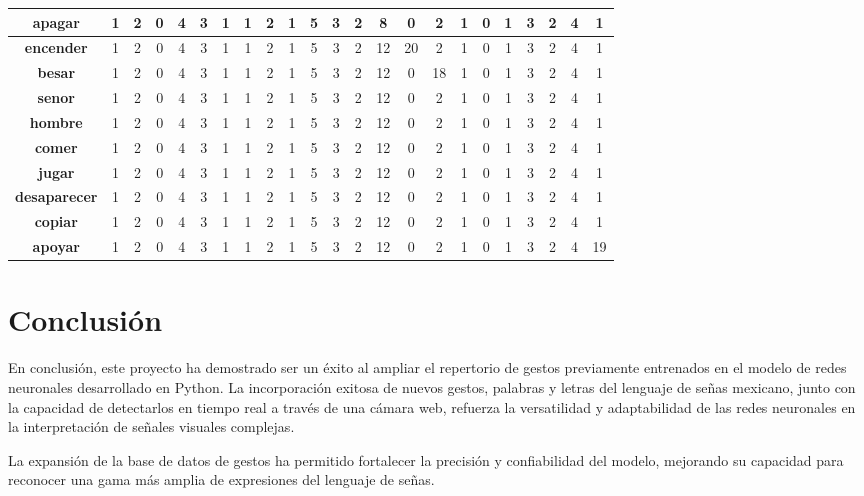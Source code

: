 \documentclass[conference]{IEEEtran}
\begin{document}
\begin{table}[h!]
{\begin{adjustbox}{angle=0}
\begin{tabular}{|c|c|c|c|c|c|c|c|c|c|c|c|c|c|c|c|c|c|c|c|c|c|c|}
\hline
\textbf{apagar} & 1 & 2 & 0 & 4 & 3 & 1 & 1 & 2 & 1 & 5 & 3 & 2 & 8 & 0 & 2 & 1 & 0 & 1 & 3 & 2 & 4 & 1 \\
\hline
\textbf{encender} & 1 & 2 & 0 & 4 & 3 & 1 & 1 & 2 & 1 & 5 & 3 & 2 & 12 & 20 & 2 & 1 & 0 & 1 & 3 & 2 & 4 & 1 \\
\hline
\textbf{besar} & 1 & 2 & 0 & 4 & 3 & 1 & 1 & 2 & 1 & 5 & 3 & 2 & 12 & 0 & 18 & 1 & 0 & 1 & 3 & 2 & 4 & 1 \\
\hline
\textbf{senor} & 1 & 2 & 0 & 4 & 3 & 1 & 1 & 2 & 1 & 5 & 3 & 2 & 12 & 0 & 2 & 1 & 0 & 1 & 3 & 2 & 4 & 1 \\
\hline
\textbf{hombre} & 1 & 2 & 0 & 4 & 3 & 1 & 1 & 2 & 1 & 5 & 3 & 2 & 12 & 0 & 2 & 1 & 0 & 1 & 3 & 2 & 4 & 1 \\
\hline
\textbf{comer} & 1 & 2 & 0 & 4 & 3 & 1 & 1 & 2 & 1 & 5 & 3 & 2 & 12 & 0 & 2 & 1 & 0 & 1 & 3 & 2 & 4 & 1 \\
\hline
\textbf{jugar} & 1 & 2 & 0 & 4 & 3 & 1 & 1 & 2 & 1 & 5 & 3 & 2 & 12 & 0 & 2 & 1 & 0 & 1 & 3 & 2 & 4 & 1 \\
\hline
\textbf{desaparecer} & 1 & 2 & 0 & 4 & 3 & 1 & 1 & 2 & 1 & 5 & 3 & 2 & 12 & 0 & 2 & 1 & 0 & 1 & 3 & 2 & 4 & 1 \\
\hline
\textbf{copiar} & 1 & 2 & 0 & 4 & 3 & 1 & 1 & 2 & 1 & 5 & 3 & 2 & 12 & 0 & 2 & 1 & 0 & 1 & 3 & 2 & 4 & 1 \\
\hline
\textbf{apoyar} & 1 & 2 & 0 & 4 & 3 & 1 & 1 & 2 & 1 & 5 & 3 & 2 & 12 & 0 & 2 & 1 & 0 & 1 & 3 & 2 & 4 & 19 \\
\hline
\end{tabular}
\end{adjustbox}
}
\end{table}



\section{Conclusión}
En conclusión, este proyecto ha demostrado ser un éxito al ampliar el repertorio de gestos previamente entrenados en el modelo de redes neuronales desarrollado en Python. La incorporación exitosa de nuevos gestos, palabras y letras del lenguaje de señas mexicano, junto con la capacidad de detectarlos en tiempo real a través de una cámara web, refuerza la versatilidad y adaptabilidad de las redes neuronales en la interpretación de señales visuales complejas.

La expansión de la base de datos de gestos ha permitido fortalecer la precisión y confiabilidad del modelo, mejorando su capacidad para reconocer una gama más amplia de expresiones del lenguaje de señas.

\printbibliography
\end{document}
